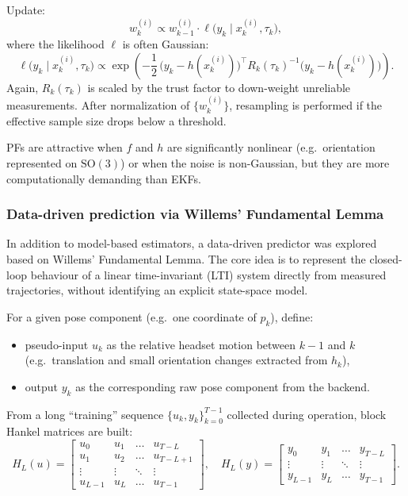 Update:
\[
w_k^{(i)} \propto w_{k-1}^{(i)} \cdot \ell\bigl(y_k \mid x_k^{(i)}, \tau_k\bigr),
\]
where the likelihood $\ell$ is often Gaussian:
\[
\ell\bigl(y_k \mid x_k^{(i)}, \tau_k\bigr)
\propto
\exp\!\left(
-\frac{1}{2}\, \bigl(y_k - h(x_k^{(i)})\bigr)^\top R_k(\tau_k)^{-1} \bigl(y_k - h(x_k^{(i)})\bigr)
\right).
\]
Again, $R_k(\tau_k)$ is scaled by the trust factor to down-weight unreliable measurements. After normalization of $\{w_k^{(i)}\}$, resampling is performed if the effective sample size drops below a threshold.

PFs are attractive when $f$ and $h$ are significantly nonlinear (e.g.\ orientation represented on $\mathrm{SO}(3)$) or when the noise is non-Gaussian, but they are more computationally demanding than EKFs.

\subsubsection*{Data-driven prediction via Willems’ Fundamental Lemma}

In addition to model-based estimators, a data-driven predictor was explored based on Willems’ Fundamental Lemma. The core idea is to represent the closed-loop behaviour of a linear time-invariant (LTI) system directly from measured trajectories, without identifying an explicit state-space model.

For a given pose component (e.g.\ one coordinate of $p_k$), define:
\begin{itemize}
    \item pseudo-input $u_k$ as the relative headset motion between $k-1$ and $k$ (e.g.\ translation and small orientation changes extracted from $h_k$),
    \item output $y_k$ as the corresponding raw pose component from the backend.
\end{itemize}

From a long “training” sequence $\{u_k, y_k\}_{k=0}^{T-1}$ collected during operation, block Hankel matrices are built:
\[
H_L(u) =
\begin{bmatrix}
u_0 & u_1 & \dots & u_{T-L} \\
u_1 & u_2 & \dots & u_{T-L+1} \\
\vdots & \vdots & \ddots & \vdots \\
u_{L-1} & u_L & \dots & u_{T-1}
\end{bmatrix},
\quad
H_L(y) =
\begin{bmatrix}
y_0 & y_1 & \dots & y_{T-L} \\
\vdots & \vdots & \ddots & \vdots \\
y_{L-1} & y_L & \dots & y_{T-1}
\end{bmatrix}.
\]

